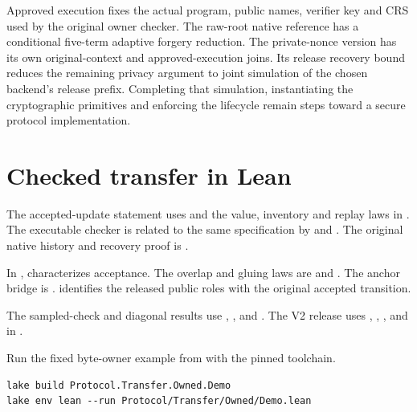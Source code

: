 Approved execution fixes the actual program, public names, verifier key and
CRS used by the original owner checker. The raw-root native reference has a
conditional five-term adaptive forgery reduction. The private-nonce version
has its own original-context and approved-execution joins. Its release
recovery bound reduces the remaining privacy argument to joint simulation
of the chosen backend's release prefix. Completing that simulation,
instantiating the cryptographic primitives and enforcing the lifecycle
remain steps toward a secure protocol implementation.

\appendix
\section{Checked transfer in Lean}
The accepted-update statement uses 
and the value, inventory and replay laws in .
The executable checker is related to the same specification by
 and
. The original native history and
recovery proof is .

In ,  characterizes acceptance.
The overlap and gluing laws are 
and . The anchor bridge is
.
 identifies the released public
roles with the original accepted transition.

The sampled-check and diagonal results use ,
, and .
The V2 release uses ,
, ,
and  in .

\begin{samepage}
Run the fixed byte-owner example from  with the pinned toolchain.
\begin{verbatim}
lake build Protocol.Transfer.Owned.Demo
lake env lean --run Protocol/Transfer/Owned/Demo.lean
\end{verbatim}
\end{samepage}
